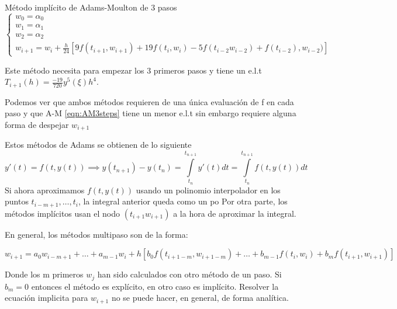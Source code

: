 \begin{method} 
    Método implícito de Adams-Moulton de 3 pasos
    \begin{equation} \label{eqn:AM3steps}
        \begin{cases}
            w_0 = \alpha_0  \\
            w_1 = \alpha_1  \\
            w_2 = \alpha_2  \\
            w_{i+1} = w_i + \frac{h}{24}[
                9f(t_{i+1},w_{i+1}) + 19f(t_i,w_i) - 5f(t_{i-2}w_{i-2}) + f(t_{i-2}),w_{i-2})
                ]
        \end{cases}
    \end{equation}   
\end{method}

Este método necesita para empezar los $3$ primeros pasos y 
tiene un e.l.t $T_{i+1}(h) = \frac{-19}{720}y^5(\xi)h^4$. %

Podemos ver que ambos métodos requieren de una única evaluación de f 
en cada paso y que A-M \ref{eqn:AM3steps} tiene un menor e.l.t sin embargo 
requiere alguna forma de despejar $w_{i+1}$

\begin{remark}
Estos métodos de Adams se obtienen de lo siguiente
    $$
    y'(t) = f(t,y(t)) \implies y(t_{n+1}) - y(t_n) = 
    \int\limits_{t_n}^{t_{n+1}} y'(t)dt = \int\limits_{t_n}^{t_{n+1}} f(t,y(t))dt
    $$
Si ahora aproximamos $f(t,y(t))$ usando un polinomio interpolador en los puntos $t_{i-m+1},\dots,t_i$, 
la integral anterior queda como un po%
Por otra parte, los métodos implícitos usan el nodo $(t_{i+1}w_{i+1})$ a la hora de aproximar la integral.
\end{remark}

En general, los métodos multipaso son de la forma:

\begin{equation} \label{mstep}
    w_{i+1} = a_0w_{i-m+1} + \dots + a_{m-1}w_i + h[
                    b_0f(t_{i+1-m},w_{i+1-m}) + \dots + b_{m-1}f(t_i,w_i) + b_mf(t_{i+1},w_{i+1})
                    ]
\end{equation}

Donde los m primeros $w_j$ han sido calculados con otro método de un paso. 
Si $b_m = 0$ entonces el método es explícito, en otro caso es implícito. 
Resolver la ecuación implicita para $w_{i+1}$ no se puede hacer, en general, de forma analítica.

